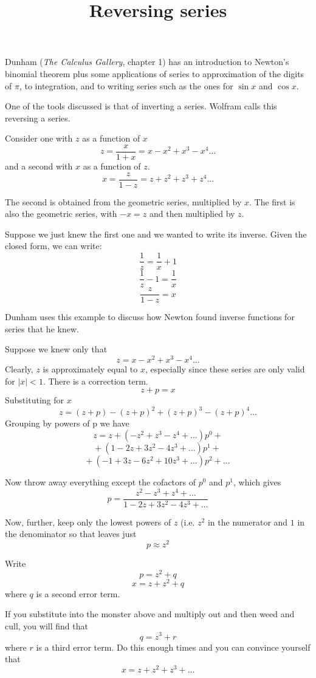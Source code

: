 \documentclass[11pt, oneside]{article}
\title{Reversing series}
\date{}
\begin{document}
\maketitle
\Large


Dunham (\emph{The Calculus Gallery}, chapter 1) has an introduction to Newton's binomial theorem plus some applications of series to approximation of the digits of $\pi$, to integration, and to writing series such as the ones for $\sin x$ and $\cos x$.

One of the tools discussed is that of inverting a series.  Wolfram calls this reversing a series.  

Consider one with $z$ as a function of $x$
\[ z = \frac{x}{1 + x} = x - x^2 + x^3 - x^4 \dots \]
and a second with $x$ as a function of $z$.
\[ x = \frac{z}{1 - z} = z + z^2 + z^3 + z^4 \dots \]

The second is obtained from the geometric series, multiplied by $x$.  The first is also the geometric series, with $-x = z$ and then multiplied by $z$.

Suppose we just knew the first one and we wanted to write its inverse.  Given the closed form, we can write:
\[ \frac{1}{z} = \frac{1}{x} + 1 \]
\[ \frac{1}{z} - 1 = \frac{1}{x} \]
\[ \frac{z}{1 - z} = x \]

Dunham uses this example to discuss how Newton found inverse functions for series that he knew.

Suppose we knew only that
\[ z =  x - x^2 + x^3 - x^4 \dots \]
Clearly, $z$ is approximately equal to $x$, especially since these series are only valid for $|x| < 1$.  There is a correction term.
\[ z + p = x \]
Substituting for $x$
\[ z = (z + p) - (z + p)^2 + (z + p)^3 - (z + p)^4 \dots \]
Grouping by powers of p we have
\[ z = z +  (-z^2 + z^3 - z^4 + \dots)p^0 + \]
\[ + \ (1 - 2z + 3z^2 - 4z^3 + \dots)p^1 +  \]
\[ + \ (-1 + 3z - 6z^2 + 10z^3 + \dots)p^2 + \dots \]

Now throw away everything except the cofactors of $p^0$ and $p^1$, which gives
\[ p = \frac{z^2 - z^3 + z^4 + \dots}{1 - 2z + 3z^2 - 4z^3 + \dots} \]

 Now, further, keep only the lowest powers of $z$ (i.e. $z^2$ in the numerator and $1$ in the denominator so that leaves just
 \[ p \approx z^2 \]

Write
\[ p = z^2 + q \]
\[ x = z + z^2 + q \]
where $q$ is a second error term.

If you substitute into the monster above and multiply out and then weed and cull, you will find that
\[ q = z^3 + r \]
where $r$ is a third error term.  Do this enough times and you can convince yourself that 
\[ x = z + z^2 + z^3 + \dots \]
\end{document}
